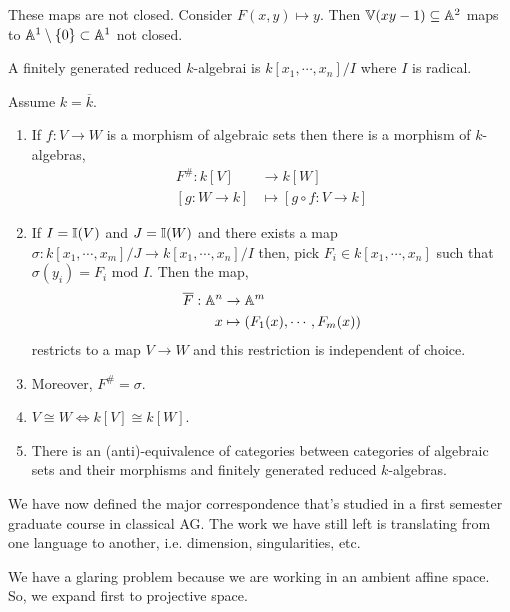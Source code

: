 \documentclass[12pt]{article}
\begin{document}
\begin{remark}
    These maps are not closed. Consider $F(x,y) \mapsto y$. Then $\mathbb V(xy-1) \subseteq \mathbb A^2$ maps to $\mathbb A^1 \setminus \{0\} \subset \mathbb A^1$ not closed.  
\end{remark}

\begin{definition}
    A finitely generated reduced $k$-algebrai is $k[x_1, \cdots, x_n]/I$ where $I$ is radical.     
\end{definition}

\begin{theorem}[Nullstellensatz II]
    Assume $k = \overline{k}$. 
    \begin{enumerate}
        \item If $f: V \to W$ is a morphism of algebraic sets then there is a morphism of $k$-algebras, 
        \begin{align*}
            F^\#: k[V] &\to k[W] \\
            [g: W \to k] &\mapsto [g\circ f: V \to k]
        \end{align*}
        \item If $I = \mathbb I(V)$ and $J = \mathbb I(W)$ and there exists a map $\sigma: k[x_1, \cdots, x_m]/J \to k[x_1, \cdots, x_n]/I$ then, pick $F_i \in k[x_1, \cdots, x_n]$ such that $\sigma(y_i) = F_i \text{ mod } I$. Then the map, 
        \begin{align*}
            \overline{F}: \mathbb A^n &\to \mathbb A^m \\
            x &\mapsto (F_1(x), \cdots, F_m(x))
        \end{align*}
        restricts to a map $V \to W$ and this restriction is independent of choice. 
        \item Moreover, $F^\# = \sigma$. 
        \item $V \cong W \iff k[V] \cong k[W]$. 
        \item There is an (anti)-equivalence of categories between categories of algebraic sets and their morphisms and finitely generated reduced $k$-algebras. 
    \end{enumerate}
\end{theorem}

We have now defined the major correspondence that's studied in a first semester graduate course in classical AG. The work we have still left is translating from one language to another, i.e. dimension, singularities, etc. 


We have a glaring problem because we are working in an ambient affine space. So, we expand first to projective space. 
\end{document}

